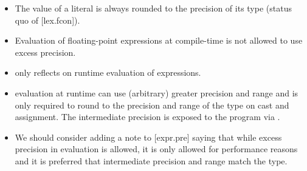 \begin{itemize}
  \item The value of a \fp literal is always rounded to the precision of its
    type (status quo of [lex.fcon]).

  \item Evaluation of floating-point expressions at compile-time is not allowed
    to use excess precision.

  \item {} only reflects on runtime evaluation of \fp
    expressions.

  \item \Fp evaluation at runtime can use (arbitrary) greater precision and
    range and is only required to round to the precision and range of the \fp
    type on cast and assignment.
    The intermediate precision is exposed to the program via
    .

  \item We should consider adding a note to [expr.pre] saying that while excess
    precision in evaluation is allowed, it is only allowed for performance
    reasons and it is preferred that intermediate precision and range match the
    \fp type.
\end{itemize}
